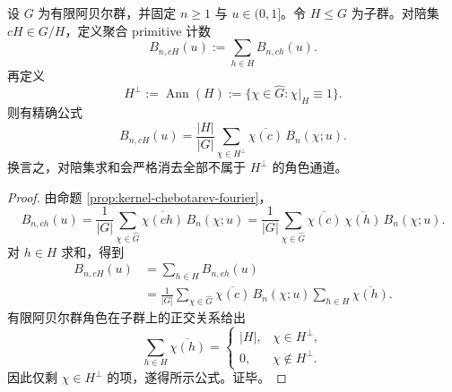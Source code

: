 \begin{theorem}\label{thm:conclusion-primitive-coset-fourier-filter}
设 \(G\) 为有限阿贝尔群，并固定 \(n\ge 1\) 与 \(u\in(0,1]\)。令 \(H\le G\) 为子群。对陪集 \(cH\in G/H\)，定义聚合 primitive 计数
\[
B_{n,cH}(u):=\sum_{h\in H}B_{n,ch}(u).
\]
再定义
\[
H^\perp:=\operatorname{Ann}(H):=
\{\chi\in\widehat G:\chi|_H\equiv 1\}.
\]
则有精确公式
\[
\boxed{\;
B_{n,cH}(u)
=
\frac{|H|}{|G|}
\sum_{\chi\in H^\perp}\overline{\chi(c)}\,B_n(\chi;u).\;}
\]
换言之，对陪集求和会严格消去全部不属于 \(H^\perp\) 的角色通道。
\end{theorem}
\begin{proof}
由命题 \ref{prop:kernel-chebotarev-fourier}，
\[
B_{n,ch}(u)=
\frac{1}{|G|}\sum_{\chi\in\widehat G}
\overline{\chi(ch)}\,B_n(\chi;u)
=
\frac{1}{|G|}\sum_{\chi\in\widehat G}
\overline{\chi(c)}\,\overline{\chi(h)}\,B_n(\chi;u).
\]
对 \(h\in H\) 求和，得到
\[
\begin{aligned}
B_{n,cH}(u)
&=
\sum_{h\in H}B_{n,ch}(u)\\
&=
\frac{1}{|G|}\sum_{\chi\in\widehat G}
\overline{\chi(c)}\,B_n(\chi;u)
\sum_{h\in H}\overline{\chi(h)}.
\end{aligned}
\]
有限阿贝尔群角色在子群上的正交关系给出
\[
\sum_{h\in H}\overline{\chi(h)}
=
\begin{cases}
|H|,& \chi\in H^\perp,\\[2pt]
0,& \chi\notin H^\perp.
\end{cases}
\]
因此仅剩 \(\chi\in H^\perp\) 的项，遂得所示公式。证毕。
\end{proof}

